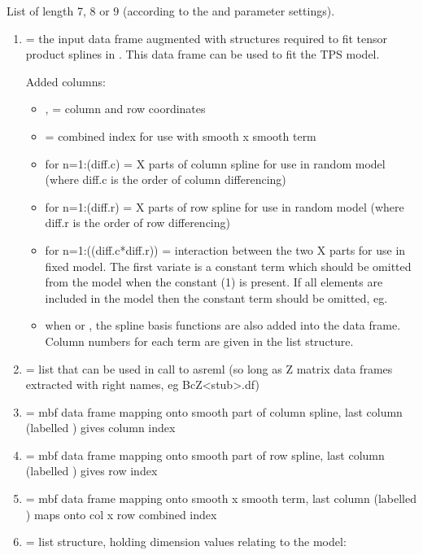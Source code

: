 \documentclass[a4paper]{book}
\begin{document}
\begin{Value}
List of length 7, 8 or 9 (according to the  and
 parameter settings).
\begin{enumerate}

\item{}  = the input data frame augmented with structures required
to fit tensor product splines in . This data frame can be used
to fit the TPS model.

Added columns:
\begin{itemize}

\item{} ,  = column and row coordinates
\item{}  = combined index for use with smooth x smooth term
\item{}  for n=1:(diff.c) = X parts of column spline for use
in random model (where diff.c is the order of column differencing)
\item{}  for n=1:(diff.r) = X parts of row spline for use in
random model (where diff.r is the order of row differencing)
\item{}  for n=1:((diff.c*diff.r)) = interaction between the
two X parts for use in fixed model. The first variate is
a constant term which should be omitted from the model when the constant
(1) is present. If all elements are
included in the model then the constant term should be omitted,
eg. 
\item{} when  or , the spline basis
functions are also added into the data frame. Column numbers for each
term are given in the  list structure.

\end{itemize}

\item{}  = list that can be used in call to asreml (so long as Z
matrix data frames extracted with right names, eg BcZ<stub>.df)
\item{}  = mbf data frame mapping onto smooth part of column
spline, last column (labelled ) gives column index
\item{}  = mbf data frame mapping onto smooth part of row spline,
last column (labelled ) gives row index
\item{}  = mbf data frame mapping onto smooth x smooth term, last
column (labelled ) maps onto col x row combined index
\item{}  = list structure, holding dimension values relating to the
model:
\begin{enumerate}


\end{enumerate}
\end{enumerate}
\end{Value}
\end{document}
